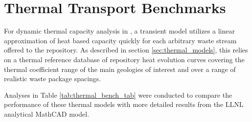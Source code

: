 \section{Thermal Transport Benchmarks} \label{sec:thermal_benchmarking}



For dynamic thermal capacity analysis in \Cyder, a transient model utilizes a 
linear approximation of heat based capacity quickly for each arbitrary waste 
stream offered to the repository. As described in section 
\ref{sec:thermal_models}, this relies on a thermal reference database 
of repository heat evolution curves covering the thermal coefficient range of 
the main geologies of interest and over a range of realistic waste package 
spacings. 

Analyses in Table \ref{tab:thermal_bench_tab} were conducted to compare the 
performance of these thermal models with more detailed results from the 
\gls{LLNL} analytical MathCAD model.

